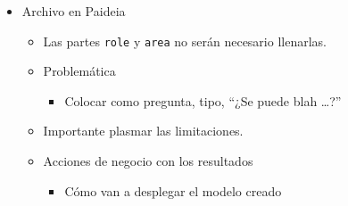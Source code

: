 \documentclass[
]{book}
\providecommand{\tightlist}{%
  \setlength{\itemsep}{0pt}\setlength{\parskip}{0pt}}
\begin{document}
\begin{itemize}
\tightlist
\item
  Archivo en Paideia

  \begin{itemize}
  \tightlist
  \item
    Las partes \texttt{role} y \texttt{area} no serán
    necesario llenarlas.
  \item
    Problemática

    \begin{itemize}
    \tightlist
    \item
      Colocar como pregunta, tipo, ``¿Se puede blah \ldots?''
    \end{itemize}
  \item
    Importante plasmar las limitaciones.
  \item
    Acciones de negocio con los resultados

    \begin{itemize}
    \tightlist
    \item
      Cómo van a desplegar el modelo creado
    \end{itemize}
  \end{itemize}
\end{itemize}

  
\end{document}
